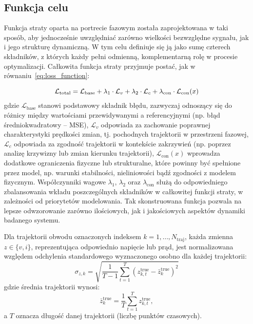 \documentclass[11pt, oneside]{article}
\begin{document}
\subsection{Funkcja celu}

Funkcja straty oparta na portrecie fazowym została zaprojektowana w taki sposób, aby jednocześnie uwzględniać zarówno wielkości bezwzględne sygnału, jak i jego strukturę dynamiczną. W tym celu definiuje się ją jako sumę czterech składników, z których każdy pełni odmienną, komplementarną rolę w procesie optymalizacji. Całkowita funkcja straty przyjmuje postać, jak w równaniu~\eqref{eq:loss_function}:

\begin{equation}
    \mathcal{L}_{\mathrm{total}} = \mathcal{L}_{\mathrm{base}} + \lambda_1 \cdot \mathcal{L}_{v} + \lambda_2 \cdot \mathcal{L}_{c} + \lambda_{\mathrm{con}} \cdot\mathcal{L}_{\rm con}(x)
    \label{eq:loss_function}
\end{equation}
gdzie $\mathcal{L}_{\mathrm{base}}$ stanowi podstawowy składnik błędu, zazwyczaj odnoszący się do różnicy między wartościami przewidywanymi a referencyjnymi (np. błąd średniokwadratowy – MSE), $\mathcal{L}_{v}$ odpowiada za zachowanie poprawnej charakterystyki prędkości zmian, tj. pochodnych trajektorii w przestrzeni fazowej, $\mathcal{L}_{c}$ odpowiada za zgodność trajektorii w kontekście zakrzywień (np. poprzez analizę krzywizny lub zmian kierunku trajektorii), $\mathcal{L}_{\mathrm{con}}(x)$ wprowadza dodatkowe ograniczenia fizyczne lub strukturalne, które powinny być spełnione przez model, np. warunki stabilności, nieliniowości bądź zgodności z modelem fizycznym.
Współczynniki wagowe $\lambda_1$, $\lambda_2$ oraz $\lambda_{\mathrm{con}}$ służą do odpowiedniego zbalansowania wkładu poszczególnych składników w całkowitej funkcji straty, w zależności od priorytetów modelowania. Tak skonstruowana funkcja pozwala na lepsze odwzorowanie zarówno ilościowych, jak i jakościowych aspektów dynamiki badanego systemu.


Dla trajektorii obwodu oznaczonych indeksem \( k = 1, \ldots, N_{\text{traj}} \), każda zmienna \( z \in \{v, i\} \), reprezentująca odpowiednio napięcie lub prąd, jest normalizowana względem odchylenia standardowego wyznaczonego osobno dla każdej trajektorii:
\begin{equation}
    \sigma_{z,k} = \sqrt{\frac{1}{T-1} \sum_{t=1}^{T} \left(z_{k,t}^{\mathrm{true}} - \bar{z}_k^{\mathrm{true}}\right)^2}
\end{equation}
gdzie średnia trajektorii wynosi:
\begin{equation}
    \bar{z}_k^{\mathrm{true}} = \frac{1}{T} \sum_{t=1}^{T} z_{k,t}^{\mathrm{true}},
\end{equation}
a \( T \) oznacza długość danej trajektorii (liczbę punktów czasowych).
\end{document}
